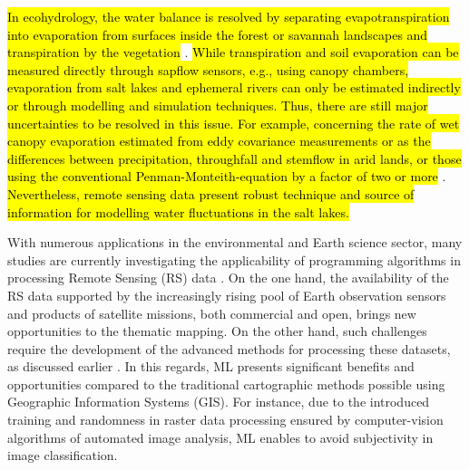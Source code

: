 \documentclass[climate,article,submit,pdftex,moreauthors]{Definitions/mdpi}
\begin{document}
\hl{In ecohydrology, the water balance is resolved by separating evapotranspiration into evaporation from surfaces inside the forest or savannah landscapes and transpiration by the vegetation} \cite{MORGAN2020104220,ZADOROVA2025108671}. \hl{While transpiration and soil evaporation can be measured directly through sapflow sensors, e.g., using canopy chambers, evaporation from salt lakes and ephemeral rivers can only be estimated indirectly or through modelling and simulation techniques. Thus, there are still major uncertainties to be resolved in this issue. For example, concerning the rate of wet canopy evaporation estimated from eddy covariance measurements or as the differences between precipitation, throughfall and stemflow in arid lands, or those using the conventional Penman-Monteith-equation by a factor of two or more} \cite{NOURANI2025113012,AHMADI2021106622,ABDULLAH2015184}. \hl{Nevertheless, remote sensing data present robust technique and source of information for modelling water fluctuations in the salt lakes.}

With numerous applications in the environmental and Earth science sector, many studies are currently investigating the applicability of programming algorithms in processing Remote Sensing (RS) data \cite{10080513,10334172,Lemenkova202227,9964623,jimaging9050098,9393066}. On the one hand, the availability of the RS data supported by the increasingly rising pool of Earth observation sensors and products of satellite missions, both commercial and open, brings new opportunities to the thematic mapping. On the other hand, such challenges require the development of the advanced methods for processing these datasets, as discussed earlier \cite{JASIEWICZ20111525}. In this regards, ML presents significant benefits and opportunities compared to the traditional cartographic methods possible using Geographic Information Systems (GIS). For instance, due to the introduced training and randomness in raster data processing ensured by computer-vision algorithms of automated image analysis, ML enables to avoid subjectivity in image classification.\hl{ } 
\end{document}

